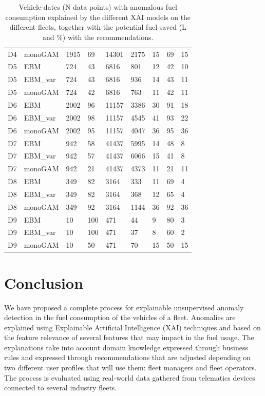 \begin{table}[h!]
{\begin{tabular}{@{}lllllllll@{}}
D4 & monoGAM & 1915 & 69 & 14301 & 2175 & 15 & 69 & 15 \\
D5 & EBM & 724 & 43 & 6816 & 801 & 12 & 42 & 10 \\
D5 & EBM\_var & 724 & 43 & 6816 & 936 & 14 & 43 & 11 \\
D5 & monoGAM & 724 & 42 & 6816 & 763 & 11 & 42 & 11 \\
D6 & EBM & 2002 & 96 & 11157 & 3386 & 30 & 91 & 18 \\
D6 & EBM\_var & 2002 & 98 & 11157 & 4545 & 41 & 93 & 22 \\
D6 & monoGAM & 2002 & 95 & 11157 & 4047 & 36 & 95 & 36 \\
D7 & EBM & 942 & 58 & 41437 & 5995 & 14 & 48 & 8 \\
D7 & EBM\_var & 942 & 57 & 41437 & 6066 & 15 & 41 & 8 \\
D7 & monoGAM & 942 & 21 & 41437 & 4373 & 11 & 21 & 11 \\
D8 & EBM & 349 & 82 & 3164 & 333 & 11 & 69 & 4 \\
D8 & EBM\_var & 349 & 82 & 3164 & 368 & 12 & 65 & 4 \\
D8 & monoGAM & 349 & 92 & 3164 & 1144 & 36 & 92 & 36 \\
D9 & EBM & 10 & 100 & 471 & 44 & 9 & 80 & 3 \\
D9 & EBM\_var & 10 & 100 & 471 & 37 & 8 & 60 & 2 \\
D9 & monoGAM & 10 & 50 & 471 & 70 & 15 & 50 & 15 \\ \bottomrule
\end{tabular}%
}
\caption{Vehicle-dates (N data points) with anomalous fuel consumption explained by the different XAI models on the different fleets, together with the potential fuel saved (L and \%) with the recommendations.}
\label{table:ch6-Fuel-Saved-Explained}
\end{table}

\newpage
\section{Conclusion}\label{sec:ch6-conclusion}
We have proposed a complete process for explainable unsupervised anomaly detection in the fuel consumption of the vehicles of a fleet. Anomalies are explained using Explainable Artificial Intelligence (XAI) techniques and based on the feature relevance of several features that may impact in the fuel usage. The explanations take into account domain knowledge expressed through business rules and expressed through recommendations that are adjusted depending on two different user profiles that will use them: fleet managers and fleet operators. The process is evaluated using real-world data gathered from telematics devices connected to several industry fleets.

